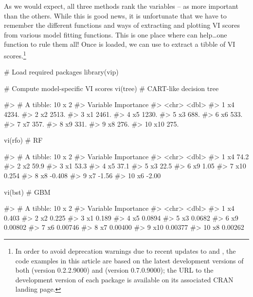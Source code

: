 As we would expect, all three methods rank the variables
-- as more important than the others. While this is
good news, it is unfortunate that we have to remember the different
functions and ways of extracting and plotting VI scores from various
model fitting functions. This is one place where  can
help\ldots one function to rule them all! Once  is loaded, we
can use  to extract a tibble of VI
scores.\footnote{In order to avoid deprecation warnings due to recent updates to  and , the code examples in this article are based on the latest development versions of both  (version 0.2.2.9000) and  (version 0.7.0.9000); the URL to the development version of each package is available on its associated CRAN landing page.}

\begin{Schunk}
\begin{Sinput}
# Load required packages
library(vip)

# Compute model-specific VI scores
vi(tree)  # CART-like decision tree
\end{Sinput}
\begin{Soutput}
#> # A tibble: 10 x 2
#>    Variable Importance
#>    <chr>         <dbl>
#>  1 x4            4234.
#>  2 x2            2513.
#>  3 x1            2461.
#>  4 x5            1230.
#>  5 x3             688.
#>  6 x6             533.
#>  7 x7             357.
#>  8 x9             331.
#>  9 x8             276.
#> 10 x10            275.
\end{Soutput}
\begin{Sinput}
vi(rfo)   # RF
\end{Sinput}
\begin{Soutput}
#> # A tibble: 10 x 2
#>    Variable Importance
#>    <chr>         <dbl>
#>  1 x4           74.2
#>  2 x2           59.9
#>  3 x1           53.3
#>  4 x5           37.1
#>  5 x3           22.5
#>  6 x9            1.05
#>  7 x10           0.254
#>  8 x8           -0.408
#>  9 x7           -1.56
#> 10 x6           -2.00
\end{Soutput}
\begin{Sinput}
vi(bst)   # GBM
\end{Sinput}
\begin{Soutput}
#> # A tibble: 10 x 2
#>    Variable Importance
#>    <chr>         <dbl>
#>  1 x4          0.403
#>  2 x2          0.225
#>  3 x1          0.189
#>  4 x5          0.0894
#>  5 x3          0.0682
#>  6 x9          0.00802
#>  7 x6          0.00746
#>  8 x7          0.00400
#>  9 x10         0.00377
#> 10 x8          0.00262
\end{Soutput}
\end{Schunk}


